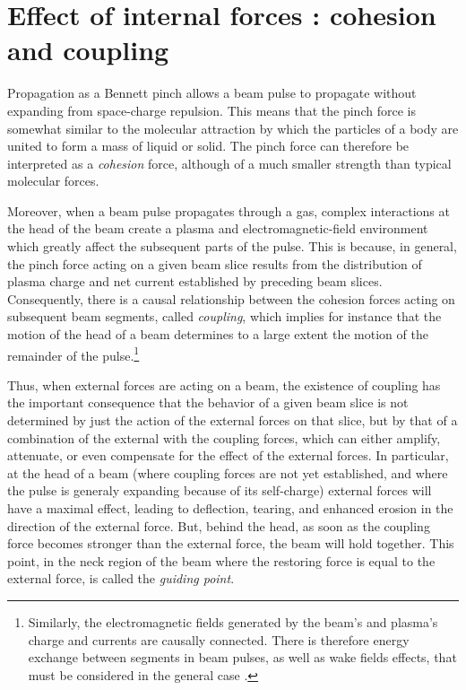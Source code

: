 \documentclass [12pt,a4paper,     ]{report} %
\begin{document}
 


\section{Effect of internal forces : cohesion and coupling}
\label{coh:0}

   Propagation as a Bennett pinch allows a beam pulse to propagate without expanding from space-charge repulsion.  This means that the pinch force is somewhat similar to the molecular attraction by which the particles of a body are united to form a mass of liquid or solid.  The pinch force can therefore be interpreted as a \emph{cohesion} force, although of a much smaller strength than typical molecular forces.

   Moreover, when a beam pulse propagates through a gas, complex interactions at the head of the beam create a plasma and electromagnetic-field environment which greatly affect the subsequent parts of the pulse.  This is because, in general, the pinch force acting on a given beam slice results from the distribution of plasma charge and net current established by preceding beam slices.  Consequently, there is a causal relationship between the cohesion forces acting on subsequent beam segments, called \emph{coupling}, which implies for instance that the motion of the head of a beam determines to a large extent the motion of the remainder of the pulse.\footnote{Similarly, the electromagnetic fields generated by the beam's and plasma's charge and currents are causally connected.  There is therefore energy exchange between segments in beam pulses, as well as wake fields effects, that must be considered in the general case \cite{UHM--1991-}.}


   Thus, when external forces are acting on a beam, the existence of coupling has the important consequence that the behavior of a given beam slice is not determined by just the action of the external forces on that slice, but by that of a combination of the external with the coupling forces, which can either amplify, attenuate, or even compensate for the effect of the external forces.  In particular, at the head of a beam (where coupling forces are not yet established, and where the pulse is generaly expanding because of its self-charge) external forces will have a maximal effect, leading to deflection, tearing, and enhanced erosion in the direction of the external force.  But, behind the head, as soon as the coupling force becomes stronger than the external force, the beam will hold together.  This point, in the neck region of the beam where the restoring force is equal to the external force, is called the \emph{guiding point}.
\end{document}
